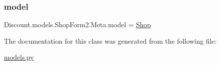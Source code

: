 \subsubsection{\texorpdfstring{model}{model}}
{\footnotesize\ttfamily Discount.\+models.\+Shop\+Form2.\+Meta.\+model = \hyperlink{class_discount_1_1models_1_1_shop}{Shop}\hspace{0.3cm}{\ttfamily [static]}}



The documentation for this class was generated from the following file\+:\begin{DoxyCompactItemize}
\item 
\hyperlink{models_8py}{models.\+py}\end{DoxyCompactItemize}
